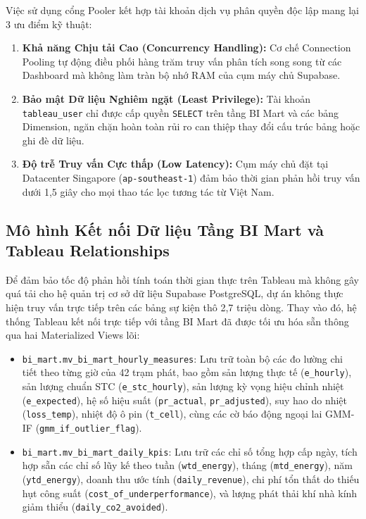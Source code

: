 \documentclass[12pt, a4paper]{report}
\begin{document}
Việc sử dụng cổng Pooler kết hợp tài khoản dịch vụ phân quyền độc lập mang lại 3 ưu điểm kỹ thuật:
\begin{enumerate}[label=\arabic*., leftmargin=*]
    \item \textbf{Khả năng Chịu tải Cao (Concurrency Handling):} Cơ chế Connection Pooling tự động điều phối hàng trăm truy vấn phân tích song song từ các Dashboard mà không làm tràn bộ nhớ RAM của cụm máy chủ Supabase.
    \item \textbf{Bảo mật Dữ liệu Nghiêm ngặt (Least Privilege):} Tài khoản \texttt{tableau\_user} chỉ được cấp quyền \texttt{SELECT} trên tầng BI Mart và các bảng Dimension, ngăn chặn hoàn toàn rủi ro can thiệp thay đổi cấu trúc bảng hoặc ghi đè dữ liệu.
    \item \textbf{Độ trễ Truy vấn Cực thấp (Low Latency):} Cụm máy chủ đặt tại Datacenter Singapore (\texttt{ap-southeast-1}) đảm bảo thời gian phản hồi truy vấn dưới 1,5 giây cho mọi thao tác lọc tương tác từ Việt Nam.
\end{enumerate}

\subsection{Mô hình Kết nối Dữ liệu Tầng BI Mart và Tableau Relationships}
\label{subsec:bi_mart_model}

Để đảm bảo tốc độ phản hồi tính toán thời gian thực trên Tableau mà không gây quá tải cho hệ quản trị cơ sở dữ liệu Supabase PostgreSQL, dự án không thực hiện truy vấn trực tiếp trên các bảng sự kiện thô 2,7 triệu dòng. Thay vào đó, hệ thống Tableau kết nối trực tiếp với tầng BI Mart đã được tối ưu hóa sẵn thông qua hai Materialized Views lõi:
\begin{itemize}
    \item \texttt{bi\_mart.mv\_bi\_mart\_hourly\_measures}: Lưu trữ toàn bộ các đo lường chi tiết theo từng giờ của 42 trạm phát, bao gồm sản lượng thực tế (\texttt{e\_hourly}), sản lượng chuẩn STC (\texttt{e\_stc\_hourly}), sản lượng kỳ vọng hiệu chỉnh nhiệt (\texttt{e\_expected}), hệ số hiệu suất (\texttt{pr\_actual}, \texttt{pr\_adjusted}), suy hao do nhiệt (\texttt{loss\_temp}), nhiệt độ ô pin (\texttt{t\_cell}), cùng các cờ báo động ngoại lai GMM-IF (\texttt{gmm\_if\_outlier\_flag}).
    \item \texttt{bi\_mart.mv\_bi\_mart\_daily\_kpis}: Lưu trữ các chỉ số tổng hợp cấp ngày, tích hợp sẵn các chỉ số lũy kế theo tuần (\texttt{wtd\_energy}), tháng (\texttt{mtd\_energy}), năm (\texttt{ytd\_energy}), doanh thu ước tính (\texttt{daily\_revenue}), chi phí tổn thất do thiếu hụt công suất (\texttt{cost\_of\_underperformance}), và lượng phát thải khí nhà kính giảm thiểu (\texttt{daily\_co2\_avoided}).
\end{itemize}
\end{document}
